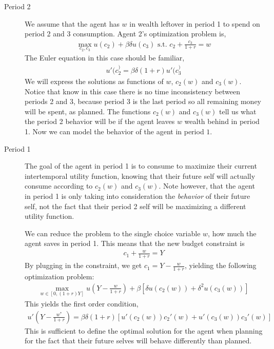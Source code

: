 \begin{description}
    \item[Period 2] We assume that the agent has $w$ in wealth leftover in period 1 to spend on period 2 and 3 consumption. Agent 2's optimization problem is,
    \begin{align*}
        \max_{c_2, c_3} u(c_2) + \beta \delta u(c_3) \text{ s.t. } c_2 + \frac{c_3}{1 + r} = w
    \end{align*} 
    The Euler equation in this case should be familiar,
    \begin{align*}
        u'(c_2^) = \beta \delta (1 + r) u'(c_3^)
    \end{align*}
    We will express the solutions as functions of $w$, $c_2(w)$ and $c_3(w)$. Notice that know in this case there is no time inconsistency between periods 2 and 3, because period 3 is the last period so all remaining money will be spent, as planned. The functions $c_2(w)$ and $c_3(w)$ tell us what the period 2 behavior will be if the agent leaves $w$ wealth behind in period 1. Now we can model the behavior of the agent in period $1$. 
    \item[Period 1] The goal of the agent in period 1 is to consume to maximize their current intertemporal utility function, knowing that their future self will actually consume according to $c_2(w)$ and $c_3(w)$. Note however, that the agent in period 1 is only taking into consideration the \emph{behavior} of their future self, not the fact that their period 2 self will be maximizing a different utility function. 
    
    We can reduce the problem to the single choice variable $w$, how much the agent saves in period 1. This means that the new budget constraint is
    \begin{align*}
        c_1 + \frac{w}{1 + r} = Y
    \end{align*}
    By plugging in the constraint, we get $c_1 = Y - \frac{w}{1 + r}$, yielding the following optimization problem:
    \begin{align*}
        \max_{w \in [0, (1 + r) Y]} u\left(Y - \frac{w}{1 + r}\right) + \beta[\delta u(c_2(w)) + \delta^2 u(c_3(w))]
    \end{align*}
    This yields the first order condition,
    \begin{align*}
        u'\left(Y - \frac{w^*}{1 + r}\right) = \beta \delta (1 + r) \left[u'(c_2(w))c_2'(w) + u'(c_3(w))c_3'(w)\right] 
    \end{align*}
    This is sufficient to define the optimal solution for the agent when planning for the fact that their future selves will behave differently than planned. 
\end{description}

